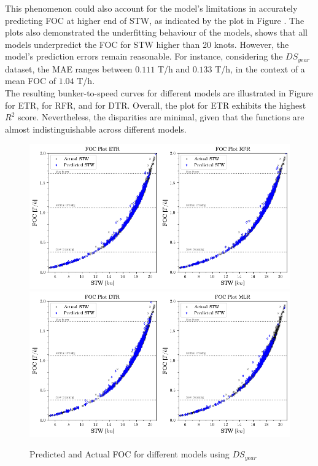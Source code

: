 This phenomenon could also account for the model's limitations in accurately predicting FOC at higher end of STW, as indicated by the plot in Figure . The plots also demonstrated the underfitting behaviour of the models,  shows that all models underpredict the FOC for STW higher than 20 knots. However, the model's prediction errors remain reasonable. For instance, considering the $DS_{year}$ dataset, the MAE ranges between $0.111$ T/h and $0.133$ T/h, in the context of a mean FOC of $1.04$ T/h.\\

The resulting bunker-to-speed curves for different models are illustrated in Figure  for ETR,  for RFR, and  for DTR. Overall, the plot for ETR exhibits the highest $R^2$ score. Nevertheless, the disparities are minimal, given that the functions are almost indistinguishable across different models.\\


\begin{figure}
    \centering
    \includegraphics[width=.9\linewidth]{02_figures/FOC_act_pred_etr_rfr.png}\\
    \includegraphics[width=.9\linewidth]{02_figures/FOC_act_pred_dtr_mlr.png}
    \caption{Predicted and Actual FOC for different models using $DS_{year}$}
    \label{fig:foc_act_all_yr}
\end{figure}

